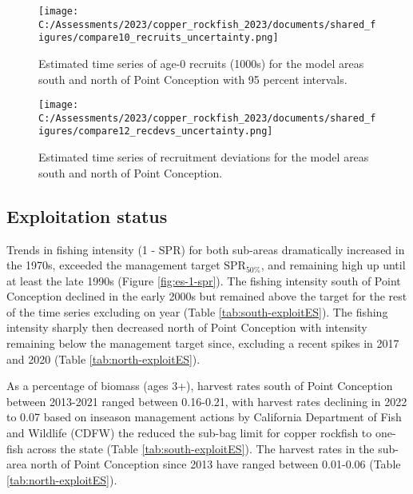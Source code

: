 \documentclass[11pt,
  english,
  letterpaper,
]{article}
\begin{document}


\newpage



\begin{figure}
\centering
\texttt{[image: C:/Assessments/2023/copper\_rockfish\_2023/documents/shared\_figures/compare10\_recruits\_uncertainty.png]}
\caption{Estimated time series of age-0 recruits (1000s) for the model areas south and north of Point Conception with 95 percent intervals.\label{fig:es-recruits}}
\end{figure}

\begin{figure}
\centering
\texttt{[image: C:/Assessments/2023/copper\_rockfish\_2023/documents/shared\_figures/compare12\_recdevs\_uncertainty.png]}
\caption{Estimated time series of recruitment deviations for the model areas south and north of Point Conception.\label{fig:es-rec-devs}}
\end{figure}

\clearpage

\hypertarget{exploitation-status}{%
\subsection*{Exploitation status}\label{exploitation-status}}

Trends in fishing intensity (1 - SPR) for both sub-areas dramatically increased in the 1970s, exceeded the management target \(\text{SPR}_{50\%}\), and remaining high up until at least the late 1990s (Figure \ref{fig:es-1-spr}). The fishing intensity south of Point Conception declined in the early 2000s but remained above the target for the rest of the time series excluding on year (Table \ref{tab:south-exploitES}). The fishing intensity sharply then decreased north of Point Conception with intensity remaining below the management target since, excluding a recent spikes in 2017 and 2020 (Table \ref{tab:north-exploitES}).

As a percentage of biomass (ages 3+), harvest rates south of Point Conception between 2013-2021 ranged between 0.16-0.21, with harvest rates declining in 2022 to 0.07 based on inseason management actions by California Department of Fish and Wildlife (CDFW) the reduced the sub-bag limit for copper rockfish to one-fish across the state (Table \ref{tab:south-exploitES}). The harvest rates in the sub-area north of Point Conception since 2013 have ranged between 0.01-0.06 (Table \ref{tab:north-exploitES}).
\end{document}

